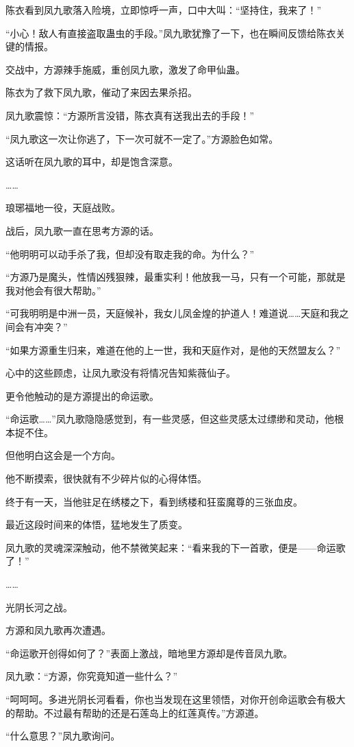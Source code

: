 \begin{this_body}
陈衣看到凤九歌落入险境，立即惊呼一声，口中大叫：“坚持住，我来了！”

“小心！敌人有直接盗取蛊虫的手段。”凤九歌犹豫了一下，也在瞬间反馈给陈衣关键的情报。

交战中，方源辣手施威，重创凤九歌，激发了命甲仙蛊。

陈衣为了救下凤九歌，催动了来因去果杀招。

凤九歌震惊：“方源所言没错，陈衣真有送我出去的手段！”

“凤九歌这一次让你逃了，下一次可就不一定了。”方源脸色如常。

这话听在凤九歌的耳中，却是饱含深意。

……

琅琊福地一役，天庭战败。

战后，凤九歌一直在思考方源的话。

“他明明可以动手杀了我，但却没有取走我的命。为什么？”

“方源乃是魔头，性情凶残狠辣，最重实利！他放我一马，只有一个可能，那就是我对他会有很大帮助。”

“可我明明是中洲一员，天庭候补，我女儿凤金煌的护道人！难道说……天庭和我之间会有冲突？”

“如果方源重生归来，难道在他的上一世，我和天庭作对，是他的天然盟友么？”

心中的这些顾虑，让凤九歌没有将情况告知紫薇仙子。

更令他触动的是方源提出的命运歌。

“命运歌……”凤九歌隐隐感觉到，有一些灵感，但这些灵感太过缥缈和灵动，他根本捉不住。

但他明白这会是一个方向。

他不断摸索，很快就有不少碎片似的心得体悟。

终于有一天，当他驻足在绣楼之下，看到绣楼和狂蛮魔尊的三张血皮。

最近这段时间来的体悟，猛地发生了质变。

凤九歌的灵魂深深触动，他不禁微笑起来：“看来我的下一首歌，便是——命运歌了！”

……

光阴长河之战。

方源和凤九歌再次遭遇。

“命运歌开创得如何了？”表面上激战，暗地里方源却是传音凤九歌。

凤九歌：“方源，你究竟知道一些什么？”

“呵呵呵。多进光阴长河看看，你也当发现在这里领悟，对你开创命运歌会有极大的帮助。不过最有帮助的还是石莲岛上的红莲真传。”方源道。

“什么意思？”凤九歌询问。


\end{this_body}
